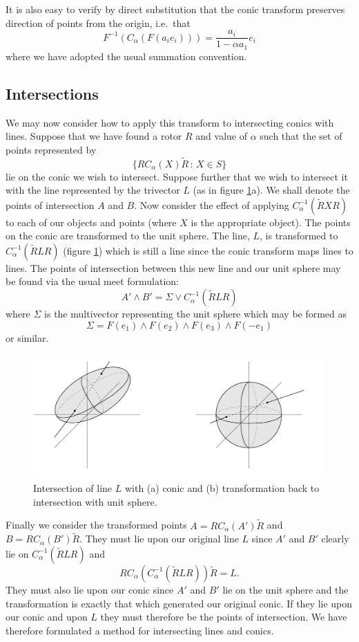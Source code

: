 It is also easy to verify by direct substitution
that the conic transform preserves direction of points from the
origin, i.e.\ that
\[
F^{-1}(C_\alpha(F( a_ie_i ))) =
	 \frac{a_i}{1 - \alpha a_1} e_i
\]
where we have adopted the usual summation convention.

\subsection{Intersections}

We may now consider how to apply this transform to intersecting conics
with lines. Suppose that we have found a rotor $R$ and value of 
$\alpha$ such that the set of points represented by
\[
\{ RC_\alpha(X)\tilde{R}\,:\,X \in S\}
\]
lie on the conic we wish to intersect. Suppose further that we wish to 
intersect it with the line represented by the trivector $L$ (as in
figure \ref{fig:conic_transform}a). We shall denote the 
points of intersection $A$ and $B$. Now consider
the effect of applying $C_\alpha^{-1}(\tilde{R} X R)$ to each of our 
objects and
points (where $X$ is the appropriate object). 
The points on the conic are transformed to the unit sphere. The line, $L$,
is transformed to $C_\alpha^{-1}(\tilde{R}LR)$ (figure \ref{fig:conic_transform}) which is still a line since the
conic transform maps lines to lines. 
The points of intersection between
this new line and our unit sphere may be found via the usual meet
formulation:
\[
A' \wedge B' = \Sigma \vee C_\alpha^{-1}(\tilde{R}LR)
\]
where $\Sigma$ is the multivector representing the unit sphere which may
be formed as 
\[
\Sigma = F(e_1) \wedge F(e_2) \wedge F(e_3) \wedge F(-e_1) %
\]
or similar.

\begin{figure}[t]\centering
\includegraphics[width=0.8\columnwidth]{conic_transform}
\caption{\label{fig:conic_transform}Intersection of line $L$ with 
  (a) conic and (b) transformation back to intersection with unit sphere.}
\end{figure}

Finally we consider the transformed points $A = RC_\alpha(A')\tilde{R}$
and
$B = RC_\alpha(B')\tilde{R}$. They must lie upon our original line 
$L$ since
$A'$ and $B'$ clearly lie on $C_\alpha^{-1}(\tilde{R}LR)$ and 
\[ RC_\alpha(C_\alpha^{-1}(\tilde{R}LR))\tilde{R} = L. \]
They must also lie upon our conic since $A'$ and $B'$ lie on the unit sphere
and the transformation is exactly that which generated our original conic.
If they lie upon our conic and upon $L$ they must therefore be the points
of intersection.
We have therefore formulated a method for intersecting lines and conics. 

